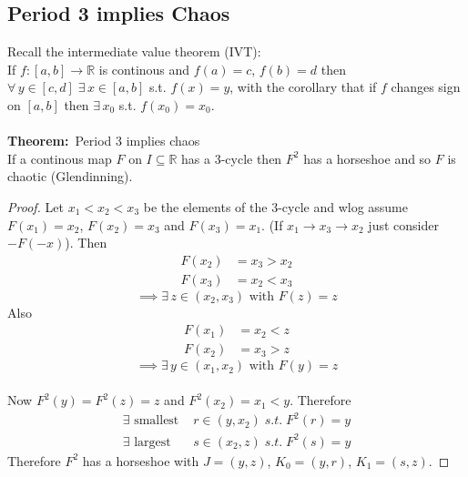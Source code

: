 \documentclass{article}
\newcommand{\theorem}{\textbf{Theorem:}}                    %
\begin{document}
\subsection{Period 3 implies Chaos}
Recall the intermediate value theorem (IVT):
\\
If $f:[a,b] \to \mathbb{R}$ is continous and $f(a)=c$, $f(b)=d$ then
$\forall \, y \in [c,d] \; \exists \, x \in [a,b]$ s.t. $f(x)=y$, with the
corollary that if $f$ changes sign on $[a,b]$ then $\exists \, x_0$ s.t. 
$f(x_0)=x_0$.
\\
\\
\theorem\ Period 3 implies chaos
\\
If a continous map $F$ on $I \subseteq \mathbb{R}$ has a 3-cycle then $F^2$
has a horseshoe and so $F$ is chaotic (Glendinning).
\begin{proof}
Let $x_1 < x_2 < x_3$ be the elements of the 3-cycle and wlog assume 
$F(x_1)=x_2$, $F(x_2)=x_3$ and $F(x_3)=x_1$. (If $x_1 \to x_3 \to x_2$ just
consider $-F(-x)$). Then 
\begin{align*} 
F(x_2) &= x_3 > x_2 \\
F(x_3) &= x_2 < x_3 
\end{align*}
\[\implies \exists \, z \in (x_2,x_3) \mbox{ with } F(z) =z  \]
Also
\begin{align*} 
F(x_1) &= x_2 < z \\
F(x_2) &= x_3 > z 
\end{align*}
\[\implies \exists \, y \in (x_1,x_2) \mbox{ with } F(y) =z  \]
\\
Now $F^2(y)=F^2(z)=z$ and $F^2(x_2)=x_1<y$. Therefore
\begin{align*}
\exists \mbox{ smallest } &r \in (y,x_2) \; s.t. \; F^2(r)=y \\
\exists \mbox{ largest } \;\; &s \in (x_2,z) \; s.t. \; F^2(s)=y 
\end{align*}
Therefore $F^2$ has a horseshoe with $J=(y,z)$, $K_0 = (y,r)$, $K_1 = (s,z)$.
\end{proof}
\end{document}
